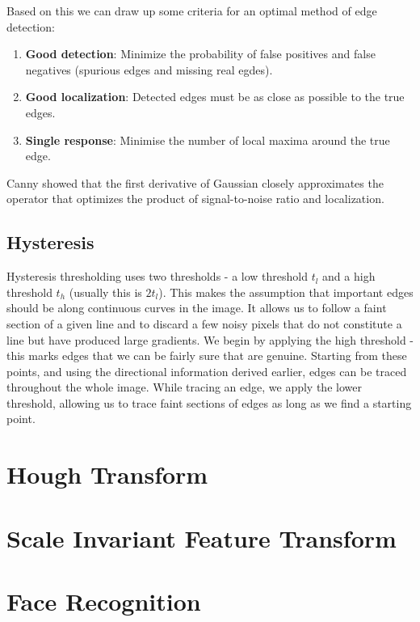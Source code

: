 \documentclass{article}
\begin{document}
	Based on this we can draw up some criteria for an optimal method of edge detection:
	\begin{enumerate}
		\item \textbf{Good detection}: Minimize the probability of false positives and false negatives (spurious edges and missing real egdes).
		\item \textbf{Good localization}: Detected edges must be as close as possible to the true edges.
		\item \textbf{Single response}: Minimise the number of local maxima around the true edge.
	\end{enumerate}

	Canny showed that the first derivative of Gaussian closely approximates the operator that optimizes the product of signal-to-noise ratio and localization.

	\subsection{Hysteresis}
	Hysteresis thresholding uses two thresholds - a low threshold $t_{l}$ and a high threshold $t_{h}$ (usually this is $2t_{l}$). This makes the assumption that important edges should be along continuous curves in the image. It allows us to follow a faint section of a given line and to discard a few noisy pixels that do not constitute a line but have produced large gradients. We begin by applying the high threshold - this marks edges that we can be fairly sure that are genuine. Starting from these points, and using the directional information derived earlier, edges can be traced throughout the whole image. While tracing an edge, we apply the lower threshold, allowing us to trace faint sections of edges as long as we find a starting point. 

	\section{Hough Transform}

	\section{Scale Invariant Feature Transform}

	\section{Face Recognition}
\end{document}
